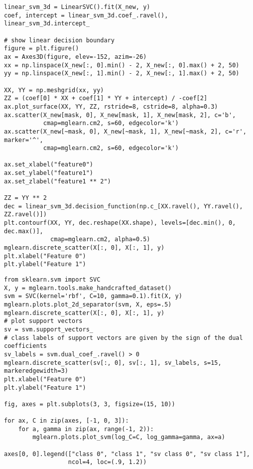 \documentclass[%
oneside,                 %
final,                   %
10pt]{article}
\begin{document}
\begin{verbatim}
linear_svm_3d = LinearSVC().fit(X_new, y)
coef, intercept = linear_svm_3d.coef_.ravel(), linear_svm_3d.intercept_

# show linear decision boundary
figure = plt.figure()
ax = Axes3D(figure, elev=-152, azim=-26)
xx = np.linspace(X_new[:, 0].min() - 2, X_new[:, 0].max() + 2, 50)
yy = np.linspace(X_new[:, 1].min() - 2, X_new[:, 1].max() + 2, 50)

XX, YY = np.meshgrid(xx, yy)
ZZ = (coef[0] * XX + coef[1] * YY + intercept) / -coef[2]
ax.plot_surface(XX, YY, ZZ, rstride=8, cstride=8, alpha=0.3)
ax.scatter(X_new[mask, 0], X_new[mask, 1], X_new[mask, 2], c='b',
           cmap=mglearn.cm2, s=60, edgecolor='k')
ax.scatter(X_new[~mask, 0], X_new[~mask, 1], X_new[~mask, 2], c='r', marker='^',
           cmap=mglearn.cm2, s=60, edgecolor='k')

ax.set_xlabel("feature0")
ax.set_ylabel("feature1")
ax.set_zlabel("feature1 ** 2")

ZZ = YY ** 2
dec = linear_svm_3d.decision_function(np.c_[XX.ravel(), YY.ravel(), ZZ.ravel()])
plt.contourf(XX, YY, dec.reshape(XX.shape), levels=[dec.min(), 0, dec.max()],
             cmap=mglearn.cm2, alpha=0.5)
mglearn.discrete_scatter(X[:, 0], X[:, 1], y)
plt.xlabel("Feature 0")
plt.ylabel("Feature 1")
\end{verbatim}

\begin{verbatim}
from sklearn.svm import SVC
X, y = mglearn.tools.make_handcrafted_dataset()                                                                  
svm = SVC(kernel='rbf', C=10, gamma=0.1).fit(X, y)
mglearn.plots.plot_2d_separator(svm, X, eps=.5)
mglearn.discrete_scatter(X[:, 0], X[:, 1], y)
# plot support vectors
sv = svm.support_vectors_
# class labels of support vectors are given by the sign of the dual coefficients
sv_labels = svm.dual_coef_.ravel() > 0
mglearn.discrete_scatter(sv[:, 0], sv[:, 1], sv_labels, s=15, markeredgewidth=3)
plt.xlabel("Feature 0")
plt.ylabel("Feature 1")

fig, axes = plt.subplots(3, 3, figsize=(15, 10))

for ax, C in zip(axes, [-1, 0, 3]):
    for a, gamma in zip(ax, range(-1, 2)):
        mglearn.plots.plot_svm(log_C=C, log_gamma=gamma, ax=a)
        
axes[0, 0].legend(["class 0", "class 1", "sv class 0", "sv class 1"],
                  ncol=4, loc=(.9, 1.2))

\end{verbatim}

\end{document}
